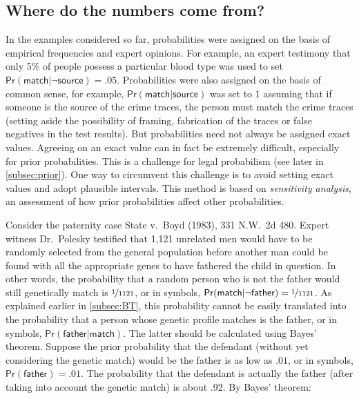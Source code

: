 \documentclass{article}
\newcommand{\pr}{\mathsf{Pr}}
\begin{document}
   
   
  
 
 
 


\subsection{Where do the numbers come from?}
\label{subsec:sensi-ana}




In the examples considered so far, probabilities were assigned on the basis of empirical frequencies and expert opinions. For example, an expert testimony that only 5\% of people possess a particular blood type was used to set $\pr(\textsf{match} \vert \neg \textsf{source})=.05$.  Probabilities were also assigned on the basis of common sense, for example, $\pr(\textsf{match} \vert \textsf{source})$ was set to $1$ assuming that if someone is the source of the crime traces, the person must match the crime traces (setting aside the possibility of framing,  fabrication of the traces or false negatives in the test results). 
But probabilities need not always be assigned exact values. Agreeing on an exact value can in fact be extremely difficult, especially for prior probabilities. 
This is a challenge for legal probabilism (see later in \ref{subsec:prior}). One way to circumvent this challenge is to avoid setting exact values and adopt plausible intervals. This method is based on \textit{sensitivity analysis}, an assessment of how prior probabilities affect other probabilities. 


Consider the paternity case State v.\ Boyd (1983), 331 N.W.\ 2d 480. Expert witness Dr.\ Polesky testified  that 1,121 unrelated men would have to be randomly selected from the general population before another man could be found with all the appropriate genes to have fathered the child in question. In other words, the  probability that a random person who is not the father would still genetically match is $\nicefrac{1}{1121}$, or in symbols, 
$\pr(\textsf{match}\vert \neg \textsf{father})=\nicefrac{1}{1121}$. As explained earlier in  \ref{subsec:BT}, this probability cannot be easily translated into the probability that a person whose genetic profile matches is  the father, or in symbols, $\pr(\textsf{father}\vert \textsf{match})$. The latter should be calculated using Bayes' theorem. %
Suppose the prior probability that the defendant (without yet considering 
the genetic match) would be the father is as low as $.01$,  or in symbols,  $\pr(\textsf{father})=.01$. 
The probability that the defendant is actually the father (after taking into account the genetic match) is 
about .92. By Bayes' theorem:
\end{document}
